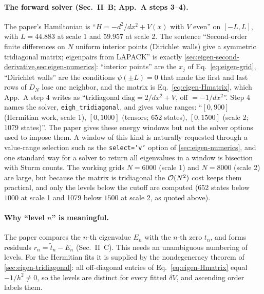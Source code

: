 \paragraph{The forward solver (Sec.~II~B; App.~A steps 3--4).} The paper's Hamiltonian is ``$H=-d^2/dx^2+V(x)$ with $V$ even'' on $[-L,L]$, with $L=44.883$ at scale 1 and $59.957$ at scale 2. The sentence ``Second-order finite differences on $N$ uniform interior points (Dirichlet walls) give a symmetric tridiagonal matrix; eigenpairs from LAPACK'' is exactly \cref{sec:eigen-second-derivative,sec:eigen-numerics}: ``interior points'' are the $x_j$ of Eq.~\eqref{eq:eigen-grid}, ``Dirichlet walls'' are the conditions $\psi(\pm L)=0$ that made the first and last rows of $D_N$ lose one neighbor, and the matrix is Eq.~\eqref{eq:eigen-Hmatrix}, which App.~A step 4 writes as ``tridiagonal $\mathrm{diag}=2/dx^2+V$, off $=-1/dx^2$''. Step 4 names the solver, \texttt{eigh\_tridiagonal}, and gives value ranges: ``$[0,900]$ (Hermitian work, scale 1), $[0,1000]$ (tensors; 652 states), $[0,1500]$ (scale 2; 1079 states)''. The paper gives these energy windows but not the solver options used to impose them. A window of this kind is naturally requested through a value-range selection such as the \texttt{select='v'} option of \cref{sec:eigen-numerics}, and one standard way for a solver to return all eigenvalues in a window is bisection with Sturm counts. The working grids $N=6000$ (scale 1) and $N=8000$ (scale 2) are large, but because the matrix is tridiagonal the $\mathcal{O}(N^2)$ cost keeps them practical, and only the levels below the cutoff are computed (652 states below $1000$ at scale 1 and 1079 below $1500$ at scale 2, as quoted above).

\paragraph{Why ``level $n$'' is meaningful.} The paper compares the $n$-th eigenvalue $E_n$ with the $n$-th zero $t_n$, and forms residuals $r_n=\tilde t_n-E_n$ (Sec.~II~C). This needs an unambiguous numbering of levels. For the Hermitian fits it is supplied by the nondegeneracy theorem of \cref{sec:eigen-tridiagonal}: all off-diagonal entries of Eq.~\eqref{eq:eigen-Hmatrix} equal $-1/h^2\ne0$, so the levels are distinct for every fitted $\delta V$, and ascending order labels them.

